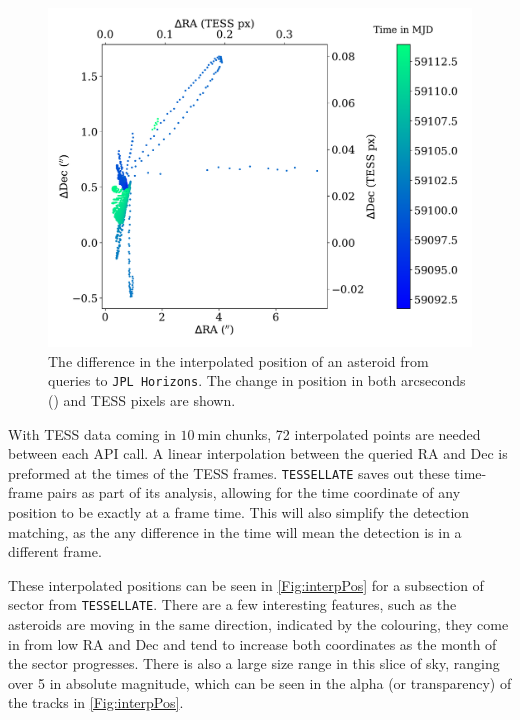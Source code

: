 \documentclass{UCreport}
\begin{document}
  
\begin{figure}[t]
  \centering
  \includegraphics[width =0.8 \textwidth]{./Figures/1990 KC1PosCheck.pdf} %
  \caption[Interpolated Position Verification]{
  The difference in the interpolated position of an asteroid from queries to \texttt{JPL Horizons}. 
  The change in position in both arcseconds (\unit{\arcsec}) and TESS pixels are shown.  
  }\label{Fig:errPos}
\end{figure}

With TESS data coming in $\qty{10}{\minute}$ chunks, 72 interpolated points are needed between each API call.
A linear interpolation between the queried RA and Dec is preformed at the times of the TESS frames.
\texttt{TESSELLATE} saves out these time-frame pairs as part of its analysis, allowing for the time coordinate of any position to be exactly at a frame time.
This will also simplify the detection matching, as the any difference in the time will mean the detection is in a different frame. 

These interpolated positions can be seen in \autoref{Fig:interpPos} for a subsection of sector from \texttt{TESSELLATE}.
There are a few interesting features, such as the asteroids are moving in the same direction, indicated by the colouring, they come in from low RA and Dec and tend to increase both coordinates as the month of the sector progresses.
There is also a large size range in this slice of sky, ranging over \qty{5}{\mag} in absolute magnitude, which can be seen in the alpha (or transparency) of the tracks in \autoref{Fig:interpPos}.
\end{document}

